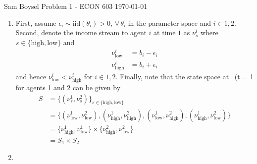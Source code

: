 \documentclass[12pt]{article}  %
\begin{document}
{\Large Sam Boysel} \hfill
{\large Problem 1 - ECON 603}  %
\hfill  \today

\begin{enumerate}
	\item First, assume \(\epsilon_{i} \sim \text{iid}(\theta_{i}) > 0, \, 
		\forall \, 
		\theta_{i}\) in the parameter space and \(i \in 1, 2\).  Second,
		denote the income stream to agent \(i\) at time \(1\) as
		\(\nu^{i}_{s}\) where \(s \in \{\text{high}, \text{low}\}\) and
		\begin{align*}
			\nu^{i}_{\text{low}} &= b_{i} - \epsilon_i \\
			\nu^{i}_{\text{high}} &= b_{i} + \epsilon_i
		\end{align*}
		and hence \(\nu^{i}_{\text{low}} < \nu^{i}_{\text{high}}\) for
		\(i \in 1, 2\).  Finally, note that the state space at \
		(t = 1\) for agents 1 and 2 can be given by
		\begin{align*}
		S &= \{(\nu^{1}_{s}, \nu^{2}_{s})\}_{s \in \{\text{high},
		\text{low}\}} \\
		&= \{(\nu^{1}_{\text{low}}, \nu^{2}_{\text{low}}),
		     (\nu^{1}_{\text{high}}, \nu^{2}_{\text{high}}),
	     	     (\nu^{1}_{\text{low}}, \nu^{2}_{\text{high}}),
	     	     (\nu^{1}_{\text{high}}, \nu^{2}_{\text{low}})\} \\
		     &= \{\nu^{1}_{\text{high}}, \nu^{1}_{\text{low}}\} \times 
	     		\{\nu^{2}_{\text{high}}, \nu^{2}_{\text{low}}\}	\\
		&= S_1 \times S_2
		\end{align*}
	\item 
\end{enumerate}
\end{document}

